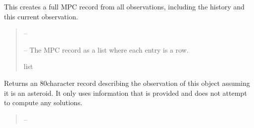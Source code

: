 \documentclass[letterpaper,11pt,english]{sphinxmanual}
\begin{document}
\begin{savenotes}
\begin{fulllineitems}
\begin{savenotes}
\begin{fulllineitems}
\end{fulllineitems}\end{savenotes}


\begin{savenotes}\begin{fulllineitems}
\label{\detokenize{code/opihiexarata.opihi.solution:opihiexarata.opihi.solution.OpihiSolution.mpc_record_full}}
\pysigstartsignatures
{}
\pysigstopsignatures
\sphinxAtStartPar
This creates a full MPC record from all observations, including the
history and this current observation.
\begin{quote}\begin{description}
\sphinxAtStartPar
{} – 

\sphinxAtStartPar
{} – The MPC record as a list where each entry is a row.

\sphinxAtStartPar
list

\end{description}\end{quote}

\end{fulllineitems}\end{savenotes}


\begin{savenotes}\begin{fulllineitems}
\label{\detokenize{code/opihiexarata.opihi.solution:opihiexarata.opihi.solution.OpihiSolution.mpc_record_row}}
\pysigstartsignatures
{}
\pysigstopsignatures
\sphinxAtStartPar
Returns an 80\sphinxhyphen{}character record describing the observation of this
object assuming it is an asteroid. It only uses information
that is provided and does not attempt to compute any solutions.
\begin{quote}\begin{description}
\sphinxAtStartPar
{} – 


\end{description}
\end{quote}
\end{fulllineitems}
\end{savenotes}
\end{fulllineitems}
\end{savenotes}
\end{document}

